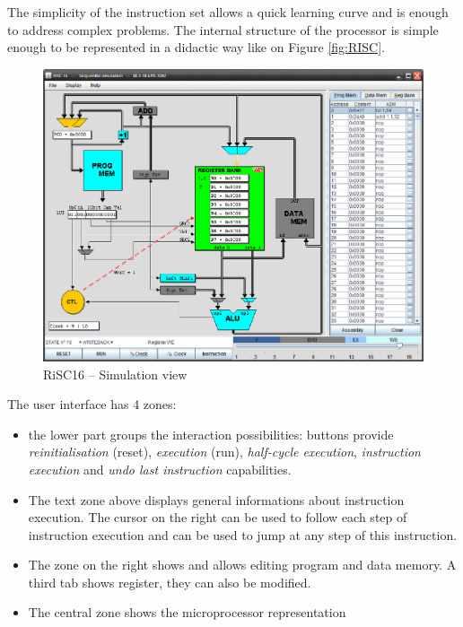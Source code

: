 \documentclass[10pt,a4paper]{article}
\theoremstyle{definition}%
\begin{document}
The simplicity of the instruction set allows a quick learning curve and is enough to address complex problems.
The internal structure of the processor is simple enough to be represented in a didactic way like on Figure \vref{fig:RISC}.

\begin{figure}[h!]
	\begin{center}
		\includegraphics[width=16cm]{RiSC16_enonce_1_html_m16049efd.png}
	\end{center}
\caption{RiSC16 -- Simulation view}
\label{fig:RISC}
\end{figure}
\newpage
The user interface has 4 zones:
\begin{itemize}
\item the lower part groups the interaction possibilities: buttons provide \textit{reinitialisation} (reset), \textit{execution} (run), \textit{half-cycle execution}, \textit{instruction execution} and \textit{undo last instruction} capabilities.
\item The text zone above displays general informations about instruction execution. The cursor on the right can be used to follow each step of instruction execution and can be used to jump at any step of this instruction.
\item The zone on the right shows and allows editing program and data memory. A third tab shows register, they can also be modified.
\item The central zone shows the microprocessor representation

\end{itemize}
\end{document}
